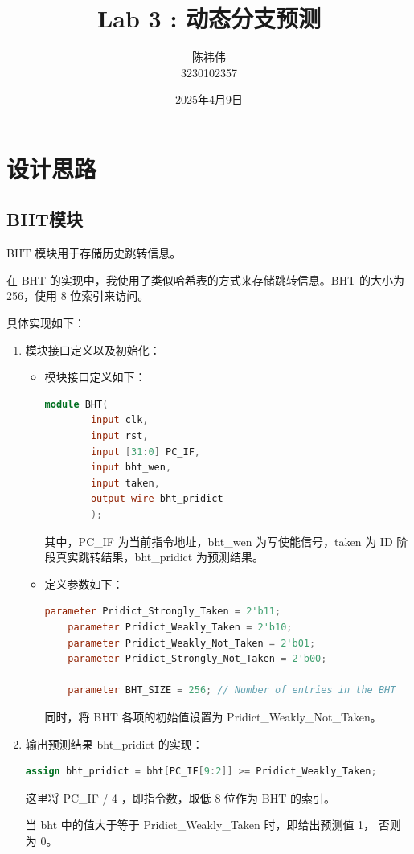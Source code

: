 \documentclass{article}
\author{陈祎伟\\3230102357}
\title{Lab 3 : 动态分支预测}
\date{2025年4月9日}
\begin{document}
\maketitle
\section{设计思路}
\subsection{BHT模块}
BHT 模块用于存储历史跳转信息。\par
在 BHT 的实现中，我使用了类似哈希表的方式来存储跳转信息。BHT 的大小为 256，使用 8 位索引来访问。\par
具体实现如下：\par
\begin{enumerate}
    \item 模块接口定义以及初始化：\par
    \begin{itemize}
        \item 模块接口定义如下：\par
        \begin{lstlisting}[language=Verilog]
    module BHT(
        input clk,
        input rst,
        input [31:0] PC_IF,
        input bht_wen,
        input taken,
        output wire bht_pridict
        );
        \end{lstlisting}
        其中，PC\_IF 为当前指令地址，bht\_wen 为写使能信号，taken 为 ID 阶段真实跳转结果，bht\_pridict 为预测结果。\par

        \item 定义参数如下：\par
        \begin{lstlisting}[language=Verilog]
    parameter Pridict_Strongly_Taken = 2'b11;
    parameter Pridict_Weakly_Taken = 2'b10;
    parameter Pridict_Weakly_Not_Taken = 2'b01;
    parameter Pridict_Strongly_Not_Taken = 2'b00;

    parameter BHT_SIZE = 256; // Number of entries in the BHT
    \end{lstlisting}
        同时，将 BHT 各项的初始值设置为 Pridict\_Weakly\_Not\_Taken。\par

    \end{itemize}

    \item 输出预测结果 bht\_pridict 的实现：\par
    \begin{lstlisting}[language=Verilog]
    assign bht_pridict = bht[PC_IF[9:2]] >= Pridict_Weakly_Taken;
    \end{lstlisting}
    这里将 PC\_IF / 4 ，即指令数，取低 8 位作为 BHT 的索引。\par
    当 bht 中的值大于等于 Pridict\_Weakly\_Taken 时，即给出预测值 1， 否则为 0。\par


\end{enumerate}
\end{document}
